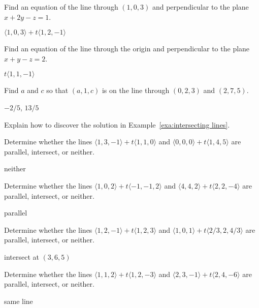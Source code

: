 \begin{enumialphparenastyle}
\begin{ex}
Find an equation of the line through $(1,0,3)$ and 
perpendicular to the plane $x+2y-z=1$.
\begin{sol}
	$\langle 1,0,3\rangle+t\langle 1,2,-1\rangle$
\end{sol}
\end{ex}

\begin{ex}
Find an equation of the line through the origin
and perpendicular to the plane $x+y-z=2$.
\begin{sol}
	$t\langle 1,1,-1\rangle$
\end{sol}
\end{ex}

\begin{ex}
Find $a$ and $c$ so that $(a,1,c)$ is on the line through
$(0,2,3)$ and $(2,7,5)$.
\begin{sol}
	$-2/5$, $13/5$
\end{sol}
\end{ex}

\begin{ex}
Explain how to discover the solution in
Example~\ref{exa:intersecting lines}.
\end{ex}

\begin{ex}
Determine whether the lines $\langle 1,3,-1\rangle+t\langle
1,1,0\rangle$ and $\langle 0,0,0\rangle+t\langle 1,4,5\rangle$ are
parallel, intersect, or neither.
\begin{sol}
	neither
\end{sol}
\end{ex}

\begin{ex}
Determine whether the lines $\langle 1,0,2\rangle+t\langle
-1,-1,2\rangle$ and $\langle 4,4,2\rangle+t\langle 2,2,-4\rangle$ are
parallel, intersect, or neither.
\begin{sol}
	parallel
\end{sol}
\end{ex}

\begin{ex}
Determine whether the lines $\langle 1,2,-1\rangle+t\langle
1,2,3\rangle$ and $\langle 1,0,1\rangle+t\langle 2/3,2,4/3\rangle$ are
parallel, intersect, or neither.
\begin{sol}
	intersect at $(3,6,5)$
\end{sol}
\end{ex}

\begin{ex}
Determine whether the lines $\langle 1,1,2\rangle+t\langle
1,2,-3\rangle$ and $\langle 2,3,-1\rangle+t\langle 2,4,-6\rangle$ are
parallel, intersect, or neither.
\begin{sol}
	same line
\end{sol}
\end{ex}


\end{enumialphparenastyle}

